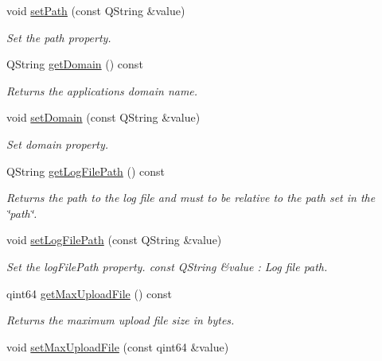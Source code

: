 \begin{DoxyCompactItemize}
void \mbox{\hyperlink{class_configuration_ade67019de7f09f22093d920fc30152e5}{set\+Path}} (const Q\+String \&value)
\begin{DoxyCompactList}\small\item\em Set the path property. \end{DoxyCompactList}\item 
Q\+String \mbox{\hyperlink{class_configuration_ab58d8dc13a90745af4925e9b238c8cff}{get\+Domain}} () const
\begin{DoxyCompactList}\small\item\em Returns the applications domain name. \end{DoxyCompactList}\item 
void \mbox{\hyperlink{class_configuration_af31a608106ec376f01acc028ccb09cb8}{set\+Domain}} (const Q\+String \&value)
\begin{DoxyCompactList}\small\item\em Set domain property. \end{DoxyCompactList}\item 
Q\+String \mbox{\hyperlink{class_configuration_a005e1d10c605e08d73ff274f2b19fc48}{get\+Log\+File\+Path}} () const
\begin{DoxyCompactList}\small\item\em Returns the path to the log file and must to be relative to the path set in the \char`\"{}path\char`\"{}. \end{DoxyCompactList}\item 
\mbox{\label{class_configuration_a83269c31da560355e67fdf452f7e24b0}} 
void \mbox{\hyperlink{class_configuration_a83269c31da560355e67fdf452f7e24b0}{set\+Log\+File\+Path}} (const Q\+String \&value)
\begin{DoxyCompactList}\small\item\em Set the log\+File\+Path property. const Q\+String \&value \+: Log file path. \end{DoxyCompactList}\item 
qint64 \mbox{\hyperlink{class_configuration_a8bc88e3cfe151837ee77e213e441953e}{get\+Max\+Upload\+File}} () const
\begin{DoxyCompactList}\small\item\em Returns the maximum upload file size in bytes. \end{DoxyCompactList}\item 
void \mbox{\hyperlink{class_configuration_ada37d2f25a05d7b9fa5676f824b7e3be}{set\+Max\+Upload\+File}} (const qint64 \&value)

\end{DoxyCompactItemize}
